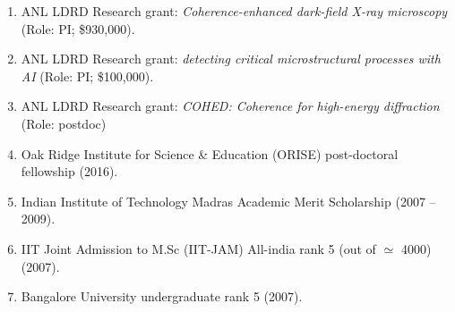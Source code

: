 \begin{enumerate}
   \item ANL LDRD Research grant: \emph{Coherence-enhanced dark-field X-ray microscopy} (Role: PI; \$930,000). 
   \item ANL LDRD Research grant: \emph{detecting critical microstructural processes with AI} (Role: PI; \$100,000). 
   \item ANL LDRD Research grant: \emph{COHED: Coherence for high-energy diffraction} (Role: postdoc)
   \item Oak Ridge Institute for Science \& Education (ORISE) post-doctoral fellowship (2016). 
   \item Indian Institute of Technology Madras Academic Merit Scholarship (2007 -- 2009). 
   \item IIT Joint Admission to M.Sc (IIT-JAM) All-india rank 5 (out of $\simeq$ 4000) (2007). 
   \item Bangalore University undergraduate rank 5 (2007). 
\end{enumerate}